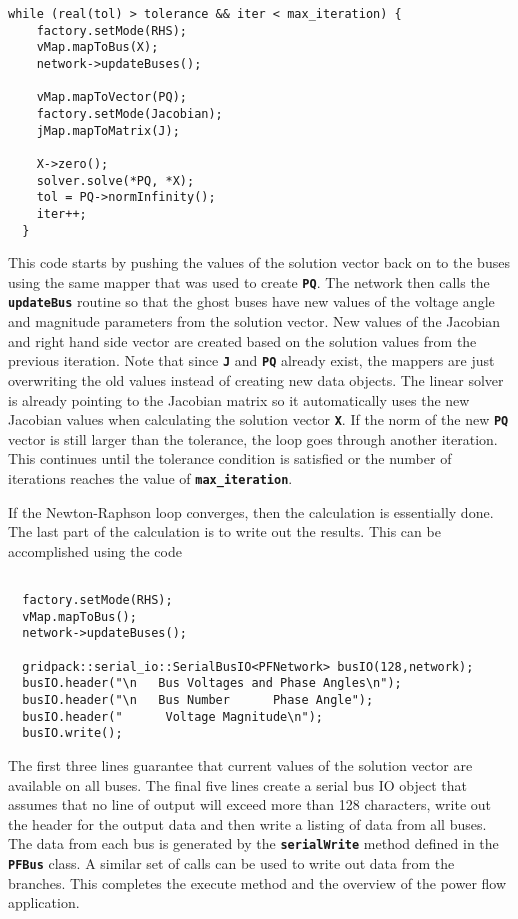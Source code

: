 {
\color{red}
\begin{Verbatim}[fontseries=b]
  while (real(tol) > tolerance && iter < max_iteration) {
    factory.setMode(RHS);
    vMap.mapToBus(X);
    network->updateBuses();

    vMap.mapToVector(PQ);
    factory.setMode(Jacobian);
    jMap.mapToMatrix(J);

    X->zero();
    solver.solve(*PQ, *X);
    tol = PQ->normInfinity();
    iter++;
  }
\end{Verbatim}
}

This code starts by pushing the values of the solution vector back on to the buses using the same mapper that was used to create \texttt{\textbf{PQ}}. The network then calls the \texttt{\textbf{updateBus}} routine so that the ghost buses have new values of the voltage angle and magnitude parameters from the solution vector. New values of the Jacobian and right hand side vector are created based on the solution values from the previous iteration. Note that since \texttt{\textbf{J}} and \texttt{\textbf{PQ}} already exist, the mappers are just overwriting the old values instead of creating new data objects. The linear solver is already pointing to the Jacobian matrix so it automatically uses the new Jacobian values when calculating the solution vector \texttt{\textbf{X}}. If the norm of the new \texttt{\textbf{PQ}} vector is still larger than the tolerance, the loop goes through another iteration. This continues until the tolerance condition is satisfied or the number of iterations reaches the value of \texttt{\textbf{max\_iteration}}.

If the Newton-Raphson loop converges, then the calculation is essentially done. The last part of the calculation is to write out the results. This can be accomplished using the code

{
\color{red}
\begin{Verbatim}[fontseries=b]

  factory.setMode(RHS);
  vMap.mapToBus();
  network->updateBuses();

  gridpack::serial_io::SerialBusIO<PFNetwork> busIO(128,network);
  busIO.header("\n   Bus Voltages and Phase Angles\n");
  busIO.header("\n   Bus Number      Phase Angle");
  busIO.header("      Voltage Magnitude\n");
  busIO.write();
\end{Verbatim}
}

The first three lines guarantee that current values of the solution vector are
available on all buses. The final five lines 
create a serial bus IO object that assumes that no line of output will exceed
more than 128 characters, write out the header for the output data and then write a listing of data from all buses. The data from each bus is generated by the \texttt{\textbf{serialWrite}} method defined in the \texttt{\textbf{PFBus}} class. A similar set of calls can be used to write out data from the branches. This completes the execute method and the overview of the power flow application.
